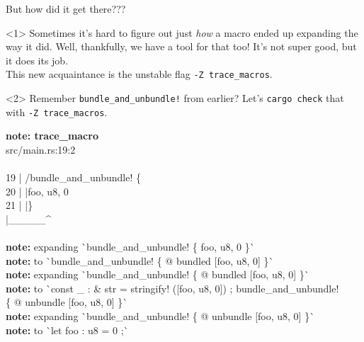 \documentclass{beamer}
\newcommand{\errgreen}[1]{{\color{errgreencolour}#1}}
\newcommand{\errblue}[1]{{\color{errbluecolour}#1}}
\begin{document}
	\begin{frame}[fragile]{But how did it get there???}
		\begin{onlyenv}<1>
			Sometimes it's hard to figure out just \emph{how} a macro ended up expanding the way it
			did. Well, thankfully, we have a tool for that too! It's not super good, but it does
			its job.\\

			This new acquaintance is the unstable flag \texttt{-Z trace\_macros}.
		\end{onlyenv}

		\begin{onlyenv}<2>
			Remember \texttt{bundle\_and\_unbundle!} from earlier? Let's \texttt{cargo check} that
			with \texttt{-Z trace\_macros}.

			\begin{center}
				\colorbox{lightergrey}{
					\ttfamily
					\tiny
					\parbox{0.95\textwidth}{%
						\textbf{\errgreen{note}: trace\_macro}\\
						\phantom{xx}\errblue{-->} src/main.rs:19:2\\
						\phantom{xxx}\errblue{|}\\
						\errblue{19 |} \errgreen{/}\phantom{xxxxx}bundle\_and\_unbundle! \{\\
						\errblue{20 |} \errgreen{|}\phantom{xxxxxxxxx}foo, u8, 0\\
						\errblue{21 |} \errgreen{|}\phantom{xxxxx}\}\\
						\phantom{xxx}\errblue{|} \errgreen{|\_\_\_\_\_\^{}}\\
						\phantom{xxx}\errblue{|}\\
						\phantom{xxx}\errblue{=} \textbf{note:} %
							expanding \`{}bundle\_and\_unbundle! %
							\{ foo, u8, 0 \}\`{}\\
						\phantom{xxx}\errblue{=} \textbf{note:} %
							to \`{}bundle\_and\_unbundle! \{ %
							@ bundled [foo, u8, 0] \}\`{}\\
						\phantom{xxx}\errblue{=} \textbf{note:} %
							expanding \`{}bundle\_and\_unbundle! %
							\{ @ bundled [foo, u8, 0] \}\`{}\\
						\phantom{xxx}\errblue{=} \textbf{note:} %
							to \`{}const \_ : \& str = %
							stringify! ([foo, u8, 0]) ; bundle\_and\_unbundle!\\
						\phantom{xxxxxxxxxxx}\{ @ unbundle [foo, u8, 0] \}\`{}\\
						\phantom{xxx}\errblue{=} \textbf{note:} %
							expanding \`{}bundle\_and\_unbundle! %
							\{ @ unbundle [foo, u8, 0] \}\`{}\\
						\phantom{xxx}\errblue{=} \textbf{note:} to \`{}let foo : u8 = 0 ;\`{}%
					}
				}
			\end{center}
		\end{onlyenv}
	\end{frame}
\end{document}
